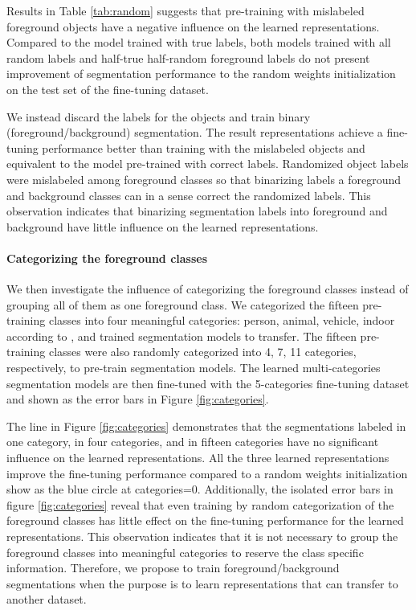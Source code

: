 Results in Table \ref{tab:random} suggests that pre-training with mislabeled foreground objects have a negative influence on the learned representations.
Compared to the model trained with true labels, both models trained with all random labels and half-true half-random foreground labels do not present improvement of segmentation performance to the random weights initialization on the test set of the fine-tuning dataset.

We instead discard the labels for the objects and train binary (foreground/background) segmentation.
The result representations achieve a fine-tuning performance better than training with the mislabeled objects and equivalent to the model pre-trained with correct labels.
Randomized object labels were mislabeled among foreground classes so that binarizing labels a foreground and background classes can in a sense correct the randomized labels.
This observation indicates that binarizing segmentation labels into foreground and background have little influence on the learned representations.

\paragraph{Categorizing the foreground classes}
We then investigate the influence of categorizing the foreground classes instead of grouping all of them as one foreground class.
We categorized the fifteen pre-training classes into four meaningful categories: person, animal, vehicle, indoor according to \cite{everingham2015pascal}, and trained segmentation models to transfer.
The fifteen pre-training classes were also randomly categorized into 4, 7, 11 categories, respectively, to pre-train segmentation models.
The learned multi-categories segmentation models are then fine-tuned with the 5-categories fine-tuning dataset and shown as the error bars in Figure \ref{fig:categories}.

The line in Figure \ref{fig:categories} demonstrates that the segmentations labeled in one category, in four categories, and in fifteen categories have no significant influence on the learned representations.
All the three learned representations improve the fine-tuning performance compared to a random weights initialization show as the blue circle at categories=0.
Additionally, the isolated error bars in figure \ref{fig:categories} reveal that even training by random categorization of the foreground classes has little effect on the fine-tuning performance for the learned representations.
This observation indicates that it is not necessary to group the foreground classes into meaningful categories to reserve the class specific information.
Therefore, we propose to train foreground/background segmentations when the purpose is to learn representations that can transfer to another dataset.

